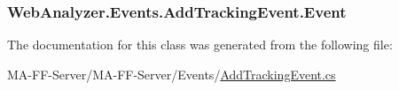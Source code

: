 \subsubsection[{Event}]{ Web\+Analyzer.\+Events.\+Add\+Tracking\+Event.\+Event\hspace{0.3cm}{\ttfamily [get]}}\label{class_web_analyzer_1_1_events_1_1_add_tracking_event_aac855bc1f8abb62af8501d10be516dd2}


The documentation for this class was generated from the following file\+:\begin{DoxyCompactItemize}
\item 
M\+A-\/\+F\+F-\/\+Server/\+M\+A-\/\+F\+F-\/\+Server/\+Events/\hyperlink{_add_tracking_event_8cs}{Add\+Tracking\+Event.\+cs}\end{DoxyCompactItemize}
